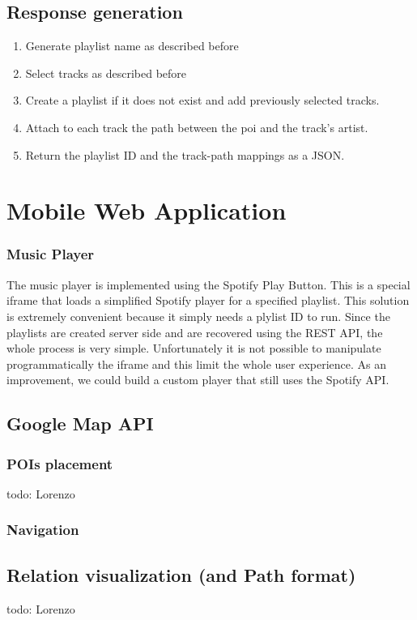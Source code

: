 \documentclass[paper=a4, fontsize=11pt]{scrartcl}
\begin{document}
\subsection{Response generation}
\begin{enumerate}
\item Generate playlist name as described before
\item Select tracks as described before
\item Create a playlist if it does not exist and add previously selected tracks.
\item Attach to each track the path between the poi and the track's artist.
\item Return the playlist ID and the track-path mappings as a JSON.
\end{enumerate}

\section{Mobile Web Application}
\subsubsection{Music Player}
The music player is implemented using the Spotify Play Button. This is a special iframe that loads a simplified Spotify player for a specified playlist. This solution is extremely convenient because it simply needs a plylist ID to run. Since the playlists are created server side and are recovered using the REST API, the whole process is very simple.
Unfortunately it is not possible to manipulate programmatically the iframe and this limit the whole user experience. As an improvement, we could build a custom player that still uses the Spotify API.
\subsection{Google Map API}
\subsubsection{POIs placement}
todo: Lorenzo

\subsubsection{Navigation}

\subsection{Relation visualization (and Path format)}
todo: Lorenzo
\end{document}
